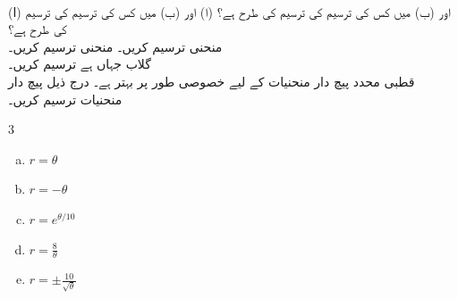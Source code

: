 \\
(ا)  اور (ب)  میں کس کی ترسیم  کی ترسیم کی طرح ہے؟
(ا)  اور (ب)  میں کس کی ترسیم  کی ترسیم کی طرح ہے؟
\\
منحنی  ترسیم کریں۔
منحنی  ترسیم کریں۔
\\
گلاب  جہاں  ہے ترسیم کریں۔
\\
قطبی محدد پیچ دار منحنیات کے لیے خصوصی طور پر بہتر ہے۔ درج ذیل پیچ دار منحنیات ترسیم کریں۔
\begin{multicols}{3}
\begin{enumerate}[a.]
\item
$r=\theta$
\item
$r=-\theta$
\item
$r=e^{\theta/10}$
\item
$r=\tfrac{8}{\theta}$
\item
$r=\pm\tfrac{10}{\sqrt{\theta}}$
\end{enumerate}
\end{multicols}

